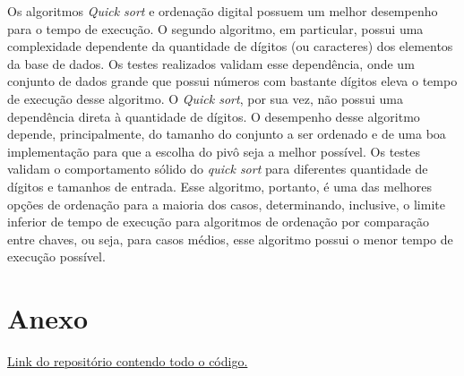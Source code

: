 \documentclass[12pt]{article}
\begin{document}
Os algoritmos \textit{Quick sort} e ordenação digital possuem um melhor desempenho para o tempo de execução. O segundo algoritmo, em particular, possui uma complexidade dependente da quantidade de dígitos (ou caracteres) dos elementos da base de dados. Os testes realizados validam esse dependência, onde um conjunto de dados grande que possui números com bastante dígitos eleva o tempo de execução desse algoritmo. O \textit{Quick sort}, por sua vez, não possui uma dependência direta à quantidade de dígitos. O desempenho desse algoritmo depende, principalmente, do tamanho do conjunto a ser ordenado e de uma boa implementação para que a escolha do pivô seja a melhor possível. Os testes validam o comportamento sólido do \textit{quick sort} para diferentes quantidade de dígitos e tamanhos de entrada. Esse algoritmo, portanto, é uma das melhores opções de ordenação para a maioria dos casos, determinando, inclusive, o limite inferior de tempo de execução para algoritmos de ordenação por comparação entre chaves, ou seja, para casos médios, esse algoritmo possui o menor tempo de execução possível. 




\section*{Anexo}

\href{https://github.com/MarcosKrul/analise-experimental-ordenacao}{Link do repositório contendo todo o código.}
\end{document}
